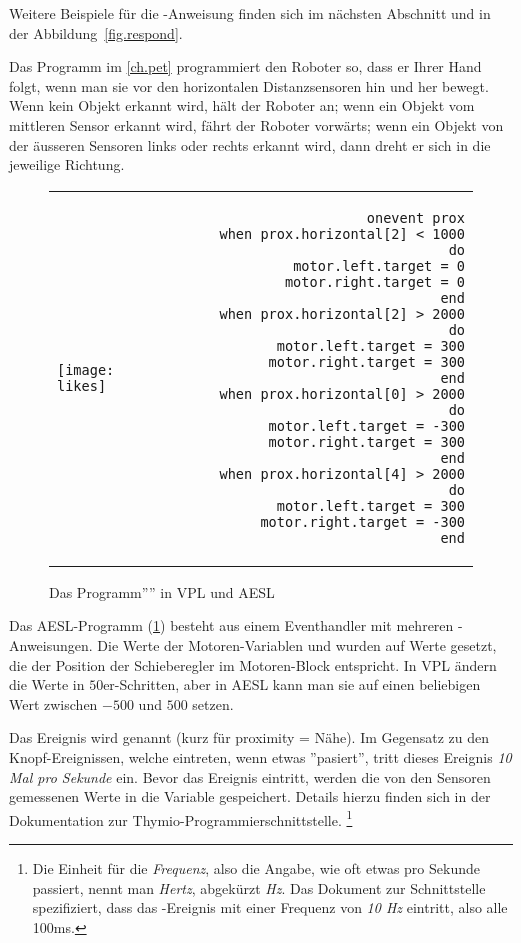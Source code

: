 Weitere Beispiele für die -Anweisung finden sich im nächsten Abschnitt und in der Abbildung~\ref{fig.respond}.


\newpage


Das Programm  im \cref{ch.pet} programmiert den Roboter so, dass er Ihrer Hand folgt, wenn man sie vor den horizontalen Distanzsensoren hin und her bewegt. Wenn kein Objekt erkannt wird, hält der Roboter an; wenn ein Objekt vom mittleren Sensor erkannt wird, fährt der Roboter vorwärts; wenn ein Objekt von der äusseren Sensoren links oder rechts erkannt wird, dann dreht er sich in die jeweilige Richtung. 

\begin{figure}[hbt]
\begin{center}
\begin{tabular}{lr}
\texttt{[image: likes]} &
\begin{minipage}[b]{.4\textwidth}
\begin{footnotesize}
\begin{verbatim}
  onevent prox
    when prox.horizontal[2] < 1000 do
      motor.left.target = 0
      motor.right.target = 0
    end
    when prox.horizontal[2] > 2000 do
      motor.left.target = 300
      motor.right.target = 300
    end
    when prox.horizontal[0] > 2000 do
      motor.left.target = -300
      motor.right.target = 300
    end
    when prox.horizontal[4] > 2000 do
      motor.left.target = 300
      motor.right.target = -300
    end
\end{verbatim}
\end{footnotesize}
\end{minipage}
\end{tabular}
\caption{Das Programm'''' in VPL und AESL}\label{fig.arrays}
\end{center}
\end{figure}

Das AESL-Programm (\cref{fig.arrays}) besteht aus einem Eventhandler mit mehreren -Anweisungen. Die Werte der Motoren-Variablen  und  wurden auf Werte gesetzt, die der Position der Schieberegler im Motoren-Block entspricht. In VPL ändern die Werte in $50$er-Schritten, aber in AESL kann man sie auf einen beliebigen Wert zwischen $-500$ und $500$ setzen.

Das Ereignis wird  genannt (kurz für proximity = Nähe). Im Gegensatz zu den Knopf-Ereignissen, welche eintreten, wenn etwas ''pasiert'', tritt dieses Ereignis \emph{10 Mal pro Sekunde} ein. Bevor das Ereignis eintritt, werden die von den Sensoren gemessenen Werte in die Variable  gespeichert. Details hierzu finden sich in der \label{pg.hz} Dokumentation zur Thymio-Programmierschnittstelle. \footnote{Die Einheit für die \emph{Frequenz}, also die Angabe, wie oft etwas pro Sekunde passiert, nennt man \emph{Hertz}, abgekürzt \emph{Hz}. Das Dokument zur Schnittstelle spezifiziert, dass das {\footnotesize{}}-Ereignis mit einer Frequenz von \emph{10 Hz} eintritt, also alle 100ms.}

